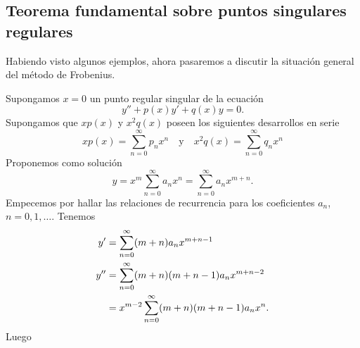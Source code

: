 \documentclass{article}
\newcounter{teor_cont}
\newcounter{ejem_cont}
\begin{document}
\subsection{Teorema fundamental sobre puntos singulares regulares}\label{eq:sec_teor_fund_frob}
Habiendo visto algunos ejemplos, ahora pasaremos a discutir la situación general del método de Frobenius. 

Supongamos $x=0$ un punto regular singular de la ecuación
\begin{equation}\label{eq:dif_2_orden} y''+p(x)y'+q(x)y=0.
\end{equation}
Supongamos que $xp(x)$ y $x^2q(x)$ poseen los  siguientes desarrollos en serie 
\[xp(x)=\sum_{n=0}^{\infty}p_nx^n\quad\text{y}\quad x^2q(x)=\sum_{n=0}^{\infty}q_nx^n\]
Proponemos como solución
\[y=x^{m}\sum_{n=0}^{\infty}a_nx^n=\sum_{n=0}^{\infty}a_nx^{m+n}.\]
Empecemos por hallar las relaciones de recurrencia para los coeficientes $a_n$, $n=0,1,\ldots$.   Tenemos
\begin{subequations}
    \begin{align}
      y'&=\sum_{n=0}^{\infty}(m+n)a_{n}x^{m+n-1}\\
      y''&=\sum_{n=0}^{\infty}(m+n)(m+n-1)a_{n}x^{m+n-2}\notag\\
&=x^{m-2}\sum_{n=0}^{\infty}(m+n)(m+n-1)a_{n}x^{n}\label{eq:der_seg} .
    \end{align}
  \end{subequations}
Luego
\end{document}
